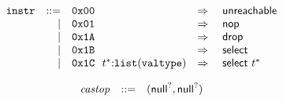 \vspace{1ex}

$$
\begin{array}[t]{@{}lrrl@{}l@{}l@{}l@{}}
& {\mathtt{instr}} & ::= & \mathtt{0x00} & \quad\Rightarrow\quad{} & \mathsf{unreachable} \\
& & | & \mathtt{0x01} & \quad\Rightarrow\quad{} & \mathsf{nop} \\
& & | & \mathtt{0x1A} & \quad\Rightarrow\quad{} & \mathsf{drop} \\
& & | & \mathtt{0x1B} & \quad\Rightarrow\quad{} & \mathsf{select} \\
& & | & \mathtt{0x1C}~~{t^\ast}{:}{\mathtt{list}}({\mathtt{valtype}}) & \quad\Rightarrow\quad{} & \mathsf{select}~{t^\ast} \\
\end{array}
$$

\vspace{1ex}

$$
\begin{array}[t]{@{}lrrl@{}l@{}}
& {\mathit{castop}} & ::= & ({\mathsf{null}^?}, {\mathsf{null}^?}) \\
\end{array}
$$

